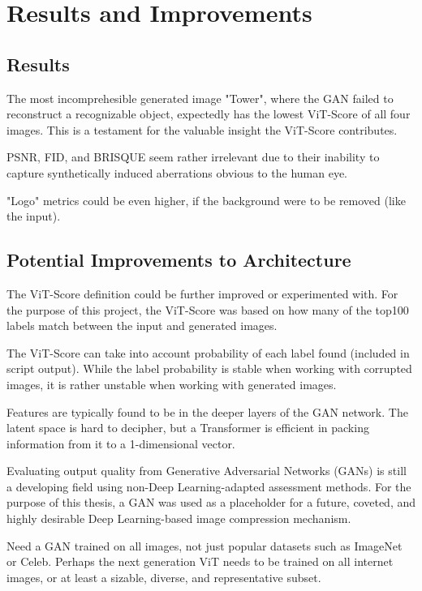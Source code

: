 \section{Results and Improvements}

\subsection{Results}

The most incomprehesible generated image "Tower", where the GAN failed to reconstruct a recognizable
object, expectedly has the lowest ViT-Score of all four images. This is a testament for the valuable 
insight the ViT-Score contributes.


PSNR, FID, and BRISQUE seem rather irrelevant due to their inability to capture synthetically induced
aberrations obvious to the human eye.

"Logo" metrics could be even higher, if the background were to be removed (like the input).

\subsection{Potential Improvements to Architecture}

The ViT-Score definition could be further improved or experimented with.
For the purpose of this project, the ViT-Score was based on how many of the top100 labels match
between the input and generated images.

The ViT-Score can take into account probability of each label found (included in script output).
While the label probability is stable when working with corrupted images, it is rather 
unstable when working with generated images.

Features are typically found to be in the deeper layers of the GAN network. 
The latent space is hard to decipher, but a Transformer is efficient in packing information from it 
to a 1-dimensional vector.

Evaluating output quality from Generative Adversarial Networks (GANs) is 
still a developing field using non-Deep Learning-adapted assessment methods. 
For the purpose of this thesis, a GAN was used as a placeholder 
for a future, coveted, and highly desirable Deep Learning-based image compression mechanism.

Need a GAN trained on all images, not just popular datasets such as ImageNet or Celeb. 
Perhaps the next generation ViT needs to be trained on all internet images, or at least a sizable, diverse, and
representative subset.

